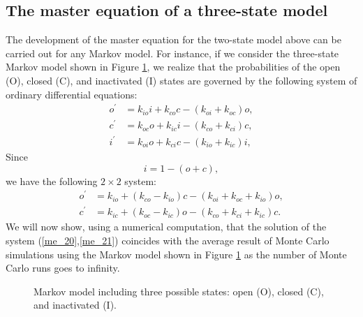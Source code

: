 \subsection[Three state model]{The master equation of a three-state model}

The development of the master equation for the two-state model above can be
carried out for any Markov model. For instance, if we consider the three-state
Markov model shown in Figure \ref{IOC_me}, we realize that the probabilities of the
open (O), closed (C), and inactivated (I) states are governed by the following system of ordinary
differential equations:
\begin{align}
o^{\prime}  & =k_{io}i+k_{co}c-\left(  k_{oi}+k_{oc}\right)  o, \nonumber \\
c^{\prime}  & =k_{oc}o+k_{ic}i-\left(  k_{co}+k_{ci}\right)  c,\label{me_11}\\
i^{\prime}  & =k_{oi}o+k_{ci}c-\left(  k_{io}+k_{ic}\right)  i, \nonumber
\end{align}
Since
\begin{equation}
i=1-\left(  o+c\right),
\end{equation}
we have the following $2 \times 2$ system:
\begin{align}
o^{\prime}  & =k_{io}+\left(  k_{co}-k_{io}\right)  c-\left(  k_{oi}
+k_{oc}+k_{io}\right)  o,\label{me_20}\\
c^{\prime}  & =k_{ic}+\left(  k_{oc}-k_{ic}\right)  o-\left(  k_{co}
+k_{ci}+k_{ic}\right)  c.\label{me_21}
\end{align}
We will now show, using a numerical computation, that the solution of the
system (\ref{me_20},\ref{me_21}) coincides with the average result of Monte Carlo simulations using
the Markov model shown in Figure \ref{IOC_me} as the number of Monte Carlo runs goes
to infinity.



\begin{figure}[ptb]
\begin{center}
\end{center}
\caption{Markov model including three possible states: open (O), closed (C), and
inactivated (I).}
\label{IOC_me}
\end{figure}




